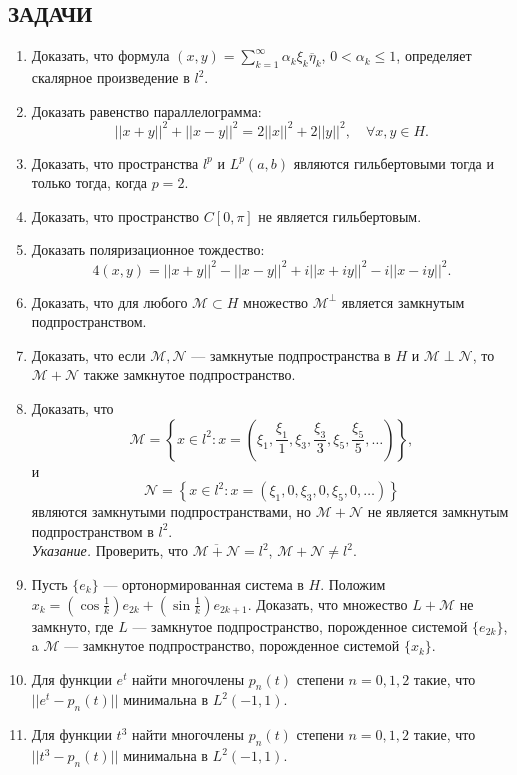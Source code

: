 \documentclass[12pt,a4paper]{article}
\begin{document}
\subsection*{ЗАДАЧИ}
\begin{enumerate}
\item Доказать, что формула $(x,y)=\sum_{k=1}^{\infty}\alpha_{k}\xi_{k}\overline{\eta}_{k}$, $0<\alpha_{k}\le1$, определяет скалярное произведение в $l^{2}$.
\item Доказать равенство параллелограмма:
$$||x+y||^{2}+||x-y||^{2}=2||x||^{2}+2||y||^{2}, \quad \forall x,y\in H.$$
\item Доказать, что пространства $l^{p}$ и $L^{p}(a,b)$ являются гильбертовыми тогда и только тогда, когда $p=2$.
\item Доказать, что пространство $C[0,\pi]$ не является гильбертовым.
\item Доказать поляризационное тождество:
$$4(x,y)=||x+y||^{2}-||x-y||^{2}+i||x+iy||^{2}-i||x-iy||^{2}.$$
\item Доказать, что для любого $\mathcal{M}\subset H$ множество $\mathcal{M}^{\perp}$ является замкнутым подпространством.
\item Доказать, что если $\mathcal{M}, \mathcal{N}$ — замкнутые подпространства в $H$ и $\mathcal{M}\perp\mathcal{N}$, то $\mathcal{M}+\mathcal{N}$ также замкнутое подпространство.
\item Доказать, что
$$\mathcal{M}=\left\{x\in l^{2}:x=\left(\xi_{1},\frac{\xi_{1}}{1},\xi_{3},\frac{\xi_{3}}{3},\xi_{5},\frac{\xi_{5}}{5},\dots\right)\right\},$$
и
$$\mathcal{N}=\left\{x\in l^{2}:x=(\xi_{1},0,\xi_{3},0,\xi_{5},0,\dots)\right\}$$
являются замкнутыми подпространствами, но $\mathcal{M}+\mathcal{N}$ не является замкнутым подпространством в $l^{2}$.\\
\textit{Указание.} Проверить, что $\overline{\mathcal{M}+\mathcal{N}}=l^{2}$, $\mathcal{M}+\mathcal{N}\ne l^{2}$.
\item Пусть $\{e_{k}\}$ — ортонормированная система в $H$. Положим $x_{k}=(\cos\frac{1}{k})e_{2k}+(\sin\frac{1}{k})e_{2k+1}$. Доказать, что множество $L+\mathcal{M}$ не замкнуто, где $L$ — замкнутое подпространство, порожденное системой $\{e_{2k}\}$, a $\mathcal{M}$ — замкнутое подпространство, порожденное системой $\{x_{k}\}$.
\item Для функции $e^{t}$ найти многочлены $p_{n}(t)$ степени $n=0,1,2$ такие, что $||e^{t}-p_{n}(t)||$ минимальна в $L^{2}(-1,1)$.
\item Для функции $t^{3}$ найти многочлены $p_{n}(t)$ степени $n=0,1,2$ такие, что $||t^{3}-p_{n}(t)||$ минимальна в $L^{2}(-1,1)$.

\end{enumerate}
\end{document}
